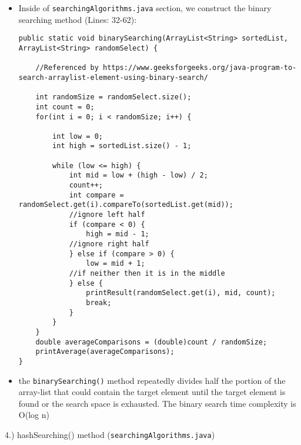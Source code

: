 \documentclass{article}
\begin{document}
\begin{itemize}
\item Inside of \verb|searchingAlgorithms.java| section, we construct the binary searching method (Lines: 32-62):

\begin{verbatim}
public static void binarySearching(ArrayList<String> sortedList, ArrayList<String> randomSelect) {

    //Referenced by https://www.geeksforgeeks.org/java-program-to-search-arraylist-element-using-binary-search/ 
    
    int randomSize = randomSelect.size();
    int count = 0;
    for(int i = 0; i < randomSize; i++) {
        
        int low = 0;
        int high = sortedList.size() - 1;
        
        while (low <= high) {
            int mid = low + (high - low) / 2;
            count++;
            int compare = randomSelect.get(i).compareTo(sortedList.get(mid));
            //ignore left half
            if (compare < 0) {
                high = mid - 1;
            //ignore right half
            } else if (compare > 0) {
                low = mid + 1;
            //if neither then it is in the middle
            } else {
                printResult(randomSelect.get(i), mid, count);
                break;
            }
        }
    }
    double averageComparisons = (double)count / randomSize;
    printAverage(averageComparisons);
}
\end{verbatim}
\item the \verb|binarySearching()| method repeatedly divides half the portion of the array-list that could contain the target element until the target element is found or the search space is exhausted.  The binary search time complexity is O(log n)\\

\end{itemize}

\pagebreak

\begin{large}
    4.) hashSearching() method (\verb|searchingAlgorithms.java|)
\end{large}
\end{document}
